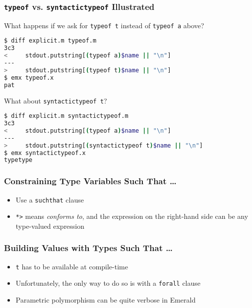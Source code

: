 \begin{frame}[fragile]

\frametitle{\lstinline{typeof} vs. \lstinline{syntactictypeof} Illustrated}

\vspace{\fill}

What happens if we ask for \lstinline{typeof t} instead of
\lstinline{typeof a} above?

\begin{lstlisting}[language=bash]
$ diff explicit.m typeof.m
3c3
<     stdout.putstring[(typeof a)$name || "\n"]
---
>     stdout.putstring[(typeof t)$name || "\n"]
$ emx typeof.x
pat
\end{lstlisting}

\vspace{\fill}

What about \lstinline{syntactictypeof t}?

\begin{lstlisting}[language=bash]
$ diff explicit.m syntactictypeof.m
3c3
<     stdout.putstring[(typeof a)$name || "\n"]
---
>     stdout.putstring[(syntactictypeof t)$name || "\n"]
$ emx syntactictypeof.x
typetype
\end{lstlisting}

\end{frame}

\begin{frame}

\frametitle{Constraining Type Variables Such That \ldots}


\begin{itemize}

\item Use a \lstinline{suchthat} clause

\item \lstinline{*>} means \emph{conforms to}, and the expression on
the right-hand side can be any type-valued expression

\end{itemize}

\end{frame}

\begin{frame}

\frametitle{Building Values with Types Such That \ldots}


\begin{itemize}

\item \lstinline{t} has to be available at compile-time

\item Unfortunately, the only way to do so is with a \lstinline{forall} clause

\item Parametric polymorphism can be quite verbose in Emerald \frownie{}

\end{itemize}

\end{frame}

